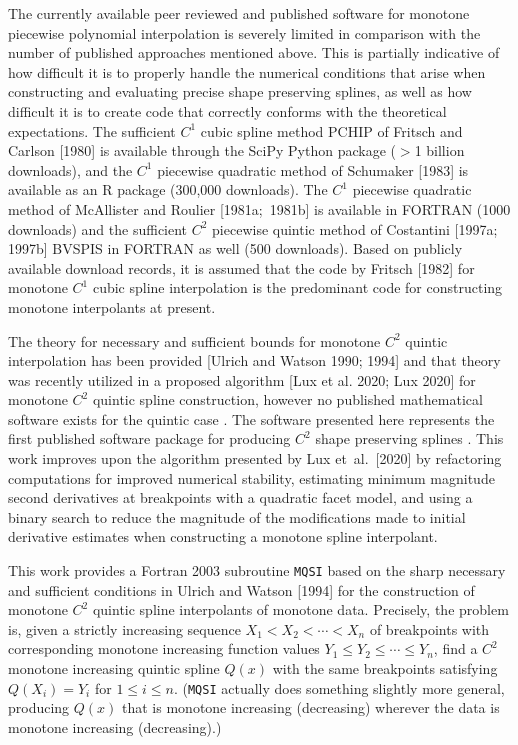The currently available peer reviewed and published software for
monotone piecewise polynomial interpolation is severely limited in
comparison with the number of published approaches mentioned
above. This is partially indicative of how difficult it is to properly
handle the numerical conditions that arise when constructing and
evaluating precise shape preserving splines, as well as how difficult
it is to create code that correctly conforms with the theoretical
expectations. The sufficient $C^1$ cubic spline method PCHIP of
Fritsch and Carlson [1980] is available through the SciPy Python
package ($>$1 billion downloads), and the $C^1$ piecewise quadratic
method of Schumaker [1983] is available as an R package (300,000
downloads). The $C^1$ piecewise quadratic method of McAllister and
Roulier [1981a;\ 1981b] is available in FORTRAN (1000 downloads) and
the sufficient $C^2$ piecewise quintic method of Costantini [1997a;
  1997b] BVSPIS in FORTRAN as well (500 downloads). Based on publicly
available download records, it is assumed that the code by Fritsch
[1982] for monotone $C^1$ cubic spline interpolation is the
predominant code for constructing monotone interpolants at present.

\endred

The theory for  necessary and sufficient bounds for
monotone $C^2$ quintic interpolation has been provided [Ulrich and
  Watson 1990; 1994] and that theory was recently utilized in a
proposed algorithm [Lux et al. 2020; Lux 2020] for monotone $C^2$
quintic spline construction, however no published mathematical
software exists for the quintic case . The software presented here represents the first published
software package for producing $C^2$ shape preserving splines
. This work improves upon
the algorithm presented by Lux et\ al.\ [2020] by refactoring
computations for improved numerical stability, estimating minimum
magnitude second derivatives at breakpoints with a quadratic facet
model, and using a binary search to reduce the magnitude of the
modifications made to initial derivative estimates when constructing a
monotone spline interpolant.

\beginred


\endred

This work provides a Fortran 2003 subroutine {\tt MQSI} based on the
sharp necessary and sufficient conditions in Ulrich and Watson [1994]
for the construction of monotone $C^2$ quintic spline interpolants of
monotone data. Precisely, the problem is, given a strictly increasing
sequence $X_1<X_2< \cdots <X_n$ of breakpoints with corresponding
monotone increasing function values $Y_1\le Y_2\le \cdots \le Y_n$,
find a $C^2$ monotone increasing quintic spline $Q(x)$ with the same
breakpoints satisfying $Q(X_i)=Y_i$ for $1\le i\le n$. ({\tt MQSI}
actually does something slightly more general, producing $Q(x)$ that
is monotone increasing (decreasing) wherever the data is monotone
increasing (decreasing).)

